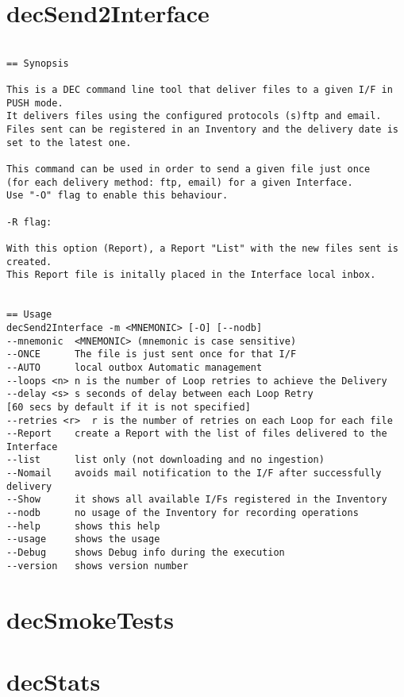 \documentclass[dec_sum_main.tex]{subfiles}
\begin{document}
\section{decSend2Interface}

\begin{verbatim}

== Synopsis

This is a DEC command line tool that deliver files to a given I/F in PUSH mode.
It delivers files using the configured protocols (s)ftp and email. 
Files sent can be registered in an Inventory and the delivery date is set to the latest one.

This command can be used in order to send a given file just once 
(for each delivery method: ftp, email) for a given Interface. 
Use "-O" flag to enable this behaviour.

-R flag:

With this option (Report), a Report "List" with the new files sent is created. 
This Report file is initally placed in the Interface local inbox.


== Usage
decSend2Interface -m <MNEMONIC> [-O] [--nodb]
--mnemonic  <MNEMONIC> (mnemonic is case sensitive)
--ONCE      The file is just sent once for that I/F
--AUTO      local outbox Automatic management 
--loops <n> n is the number of Loop retries to achieve the Delivery
--delay <s> s seconds of delay between each Loop Retry
[60 secs by default if it is not specified]
--retries <r>  r is the number of retries on each Loop for each file
--Report    create a Report with the list of files delivered to the Interface
--list      list only (not downloading and no ingestion)
--Nomail    avoids mail notification to the I/F after successfully delivery
--Show      it shows all available I/Fs registered in the Inventory
--nodb      no usage of the Inventory for recording operations
--help      shows this help
--usage     shows the usage
--Debug     shows Debug info during the execution
--version   shows version number

\end{verbatim}

\section{decSmokeTests}

\label{decStats}
\section{decStats}
\end{document}

